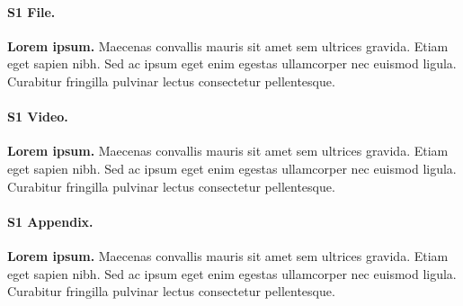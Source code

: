 \documentclass[10pt,letterpaper]{article}
\begin{document}
\paragraph*{S1 File.}
\label{S1_File}
{\bf Lorem ipsum.}  Maecenas convallis mauris sit amet sem ultrices gravida. Etiam eget sapien nibh. Sed ac ipsum eget enim egestas ullamcorper nec euismod ligula. Curabitur fringilla pulvinar lectus consectetur pellentesque.

\paragraph*{S1 Video.}
\label{S1_Video}
{\bf Lorem ipsum.}  Maecenas convallis mauris sit amet sem ultrices gravida. Etiam eget sapien nibh. Sed ac ipsum eget enim egestas ullamcorper nec euismod ligula. Curabitur fringilla pulvinar lectus consectetur pellentesque.

\paragraph*{S1 Appendix.}
\label{S1_Appendix}
{\bf Lorem ipsum.} Maecenas convallis mauris sit amet sem ultrices gravida. Etiam eget sapien nibh. Sed ac ipsum eget enim egestas ullamcorper nec euismod ligula. Curabitur fringilla pulvinar lectus consectetur pellentesque.
\end{document}
